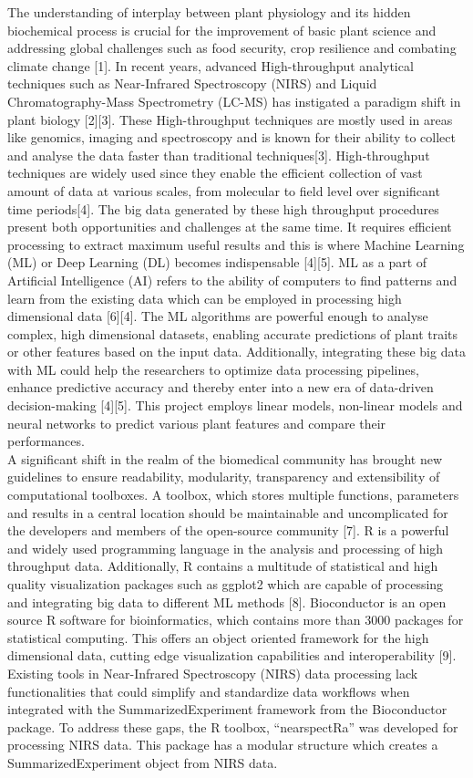 \documentclass[12pt,a4paper]{report}
\begin{document}
The understanding of interplay between plant physiology and its hidden biochemical process is crucial for the improvement of basic plant science and addressing global challenges such as food security, crop resilience and combating climate change [1]. 
In recent years, advanced High-throughput analytical techniques such as Near-Infrared Spectroscopy (NIRS) and Liquid Chromatography-Mass Spectrometry (LC-MS) has instigated a paradigm shift in plant biology [2][3].
These High-throughput techniques are mostly used in areas like genomics, imaging and spectroscopy and is known for their ability to collect and analyse the data faster than traditional techniques[3].
High-throughput techniques are widely used since they enable the efficient collection of vast amount of data at various scales, from molecular to field level over significant time periods[4].
The big data generated by these high throughput procedures present both opportunities and challenges at the same time. It requires efficient processing to extract maximum useful results and this is where Machine Learning (ML) or Deep Learning (DL) becomes indispensable [4][5].
ML as a part of Artificial Intelligence (AI) refers to the ability of computers to find patterns and learn from the existing data which can be employed in processing high dimensional data [6][4]. The ML algorithms are powerful enough to analyse complex, high dimensional datasets, 
enabling accurate predictions of plant traits or other features based on the input data. Additionally, integrating these big data with ML could help the researchers to optimize data processing pipelines, enhance predictive accuracy and thereby enter into a new era of data-driven decision-making [4][5]. This project employs linear models, non-linear models and neural networks to predict various plant features and compare their performances. \\


A significant  shift in the realm of the biomedical community has brought new guidelines to ensure readability, modularity, transparency and extensibility of computational toolboxes. A toolbox, which stores multiple functions, parameters and results in a central location should be maintainable and uncomplicated for the developers and members of the open-source community [7].
R is a powerful and widely used programming language in the analysis and processing of high throughput data. Additionally, R contains a multitude of statistical and high quality visualization packages such as ggplot2 which are capable of processing and integrating big data to different ML methods [8]. Bioconductor is an open source R software for bioinformatics, which contains more than 3000 packages for statistical computing. 
This offers an object oriented framework for the high dimensional data, cutting edge visualization capabilities and interoperability [9]. Existing tools in Near-Infrared Spectroscopy (NIRS) data processing lack functionalities that could simplify and standardize data workflows when integrated with the SummarizedExperiment framework from the Bioconductor package. To address these gaps, the R toolbox, “nearspectRa” was developed for processing NIRS data.
This package has a modular structure which creates a SummarizedExperiment object from NIRS data. \\
\end{document}
